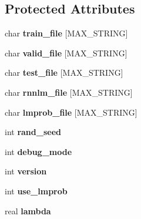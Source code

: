 \subsection*{Protected Attributes}
\begin{DoxyCompactItemize}
\item 
\mbox{\label{class_c_rnn_l_m_ae303b5893c71fd719a7eb195f8969904}} 
char {\bfseries train\+\_\+file} \mbox{[}M\+A\+X\+\_\+\+S\+T\+R\+I\+NG\mbox{]}
\item 
\mbox{\label{class_c_rnn_l_m_a306dd565a7cd3a7e78227c408ffa394b}} 
char {\bfseries valid\+\_\+file} \mbox{[}M\+A\+X\+\_\+\+S\+T\+R\+I\+NG\mbox{]}
\item 
\mbox{\label{class_c_rnn_l_m_ae07eea1cd07d154ccaeb4cfc5c4f5373}} 
char {\bfseries test\+\_\+file} \mbox{[}M\+A\+X\+\_\+\+S\+T\+R\+I\+NG\mbox{]}
\item 
\mbox{\label{class_c_rnn_l_m_a3ec8fbcecea020938513a5e3546bfbf8}} 
char {\bfseries rnnlm\+\_\+file} \mbox{[}M\+A\+X\+\_\+\+S\+T\+R\+I\+NG\mbox{]}
\item 
\mbox{\label{class_c_rnn_l_m_a1effb774075f3f4e0e6b3c0bda6fd330}} 
char {\bfseries lmprob\+\_\+file} \mbox{[}M\+A\+X\+\_\+\+S\+T\+R\+I\+NG\mbox{]}
\item 
\mbox{\label{class_c_rnn_l_m_ae74feac6f8ba9fbc03c10918551ed838}} 
int {\bfseries rand\+\_\+seed}
\item 
\mbox{\label{class_c_rnn_l_m_a8e15b3cac14bd6d3e3510e2676e271dc}} 
int {\bfseries debug\+\_\+mode}
\item 
\mbox{\label{class_c_rnn_l_m_a2b94ddb7cd2afeeb122be9dc9f20b036}} 
int {\bfseries version}
\item 
\mbox{\label{class_c_rnn_l_m_aeed9babe07c41579d599c30b31de7701}} 
int {\bfseries use\+\_\+lmprob}
\item 
\mbox{\label{class_c_rnn_l_m_a58ae1c9e2546a3d71783ec8391839acd}} 
real {\bfseries lambda}
\item 

\end{DoxyCompactItemize}
